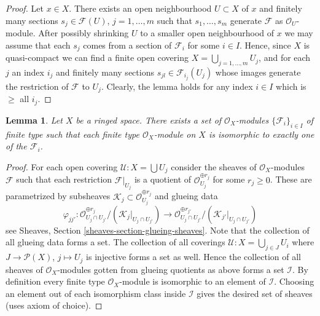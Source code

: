 \documentclass{stacks-project}
\theoremstyle{plain}
\newtheorem{lemma}[subsection]{Lemma}
\theoremstyle{definition}
\theoremstyle{remark}
\numberwithin{equation}{subsection}
\begin{document}
\begin{proof}
Let $x \in X$. There exists an open neighbourhood
$U \subset X$ of $x$ and finitely many sections
$s_j \in \mathcal{F}(U)$, $j = 1, \ldots, m$ such that
$s_1, \ldots, s_m$ generate $\mathcal{F}$ as $\mathcal{O}_U$-module.
After possibly shrinking $U$ to a smaller open neighbourhood of $x$
we may assume that each $s_j$ comes from a section of $\mathcal{F}_i$
for some $i \in I$.
Hence, since $X$ is quasi-compact we can find a finite open
covering $X = \bigcup_{j = 1, \ldots, m} U_j$, and for each $j$
an index $i_j$ and finitely many sections $s_{jl} \in \mathcal{F}_{i_j}(U_j)$
whose images generate the restriction of $\mathcal{F}$ to
$U_j$. Clearly, the lemma holds for any index $i \in I$ which
is $\geq$ all $i_j$.
\end{proof}

\begin{lemma}
\label{lemma-set-isomorphism-classes-finite-type-modules}
Let $X$ be a ringed space.
There exists a set of $\mathcal{O}_X$-modules
$\{\mathcal{F}_i\}_{i \in I}$ of finite type
such that each finite type $\mathcal{O}_X$-module
on $X$ is isomorphic to exactly one of the $\mathcal{F}_i$.
\end{lemma}

\begin{proof}
For each open covering $\mathcal{U} : X = \bigcup U_j$ consider the
sheaves of $\mathcal{O}_X$-modules $\mathcal{F}$ such that each
restriction $\mathcal{F}|_{U_j}$ is a quotient of
$\mathcal{O}_{U_j}^{\oplus r_j}$ for some $r_j \geq 0$.
These are parametrized by subsheaves
$\mathcal{K}_j \subset \mathcal{O}_{U_j}^{\oplus r_j}$ and glueing
data
$$
\varphi_{jj'} :
\mathcal{O}_{U_j \cap U_{j'}}^{\oplus r_j}/
(\mathcal{K}_j|_{U_j \cap U_{j'}})
\longrightarrow
\mathcal{O}_{U_j \cap U_{j'}}^{\oplus r_{j'}}/
(\mathcal{K}_{j'}|_{U_j \cap U_{j'}})
$$
see Sheaves, Section \ref{sheaves-section-glueing-sheaves}.
Note that the collection of all glueing data forms a set.
The collection of all coverings $\mathcal{U} : X = \bigcup_{j \in J} U_i$
where $J \to \mathcal{P}(X)$, $j \mapsto U_j$ is injective forms a set as
well. Hence the collection of all sheaves of $\mathcal{O}_X$-modules
gotten from glueing quotients as above forms a set $\mathcal{I}$.
By definition every finite type $\mathcal{O}_X$-module
is isomorphic to an element of $\mathcal{I}$. Choosing an
element out of each isomorphism class inside $\mathcal{I}$
gives the desired set of sheaves (uses axiom of choice).
\end{proof}
\end{document}
